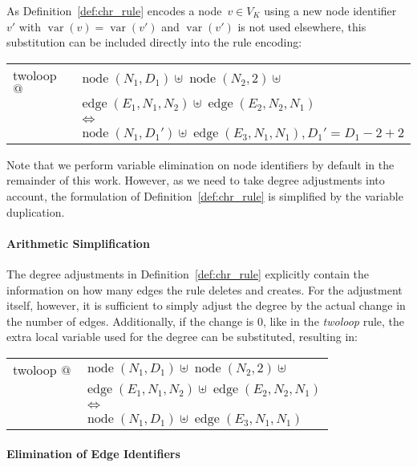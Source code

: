 \documentclass{tlp}
\DeclareMathOperator{\var}{var}
\DeclareMathOperator{\node}{node}
\DeclareMathOperator{\edge}{edge}
\begin{document}
As Definition~\ref{def:chr_rule} encodes a node~$v \in V_K$ using a new node
identifier~$v'$ with $\var(v) = \var(v')$ and $\var(v')$ is not used elsewhere,
this substitution can be included directly into the rule encoding:

\begin{center} 
\begin{tabular}{ll} 
twoloop $@$ & $\node(N_1, D_1) \uplus \node(N_2, 2) \uplus$\\
& $\edge(E_1, N_1, N_2) \uplus \edge(E_2, N_2, N_1)$\\
& $\Leftrightarrow$\\
& $\node(N_1, D_1') \uplus \edge(E_3, N_1, N_1), D_1' = D_1{-}2{+}2$
\end{tabular}
\end{center}

Note that we perform variable elimination on node identifiers by default in the
remainder of this work. However, as we need to take degree adjustments into
account, the formulation of Definition~\ref{def:chr_rule} is simplified by the
variable duplication.

\paragraph{Arithmetic Simplification}

The degree adjustments in Definition~\ref{def:chr_rule} explicitly contain the
information on how many edges the rule deletes and creates. For the adjustment
itself, however, it is sufficient to simply adjust the degree by the actual
change in the number of edges. Additionally, if the change is $0$, like in the
\emph{twoloop} rule, the extra local variable used for the degree can be
substituted, resulting in:

\begin{center} 
\begin{tabular}{ll} 
twoloop $@$ & $\node(N_1, D_1) \uplus \node(N_2, 2) \uplus$\\
& $\edge(E_1, N_1, N_2) \uplus \edge(E_2, N_2, N_1)$\\
& $\Leftrightarrow$\\
& $\node(N_1, D_1) \uplus \edge(E_3, N_1, N_1)$
\end{tabular}
\end{center}

\paragraph{Elimination of Edge Identifiers}
\end{document}
